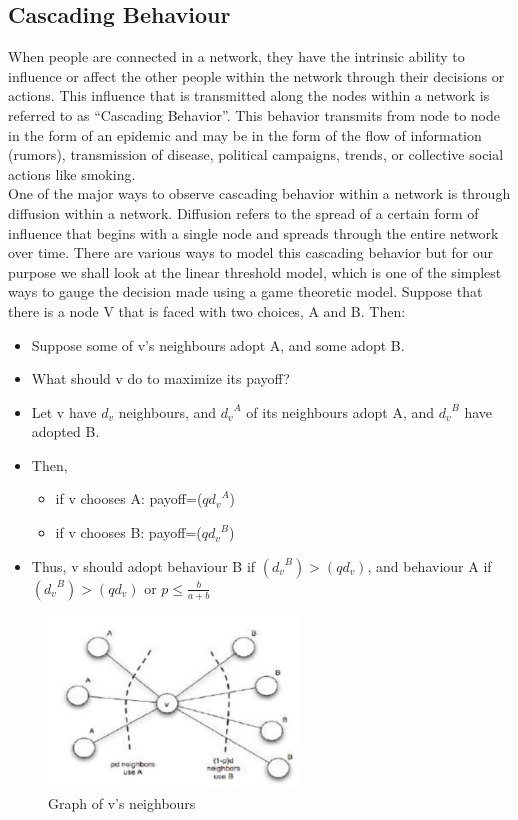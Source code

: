 \documentclass[runningheads]{llncs}
\begin{document}
\subsection{Cascading Behaviour}
When people are connected in a network, they have the intrinsic ability to influence or affect the other people within the network through their decisions or actions. This influence that is transmitted along the nodes within a network is referred to as “Cascading Behavior”. This behavior transmits from node to node in the form of an epidemic and may be in the form of the flow of information (rumors), transmission of disease, political campaigns, trends, or collective social actions like smoking.\\

One of the major ways to observe cascading behavior within a network is through diffusion within a network. Diffusion refers to the spread of a certain form of influence that begins with a single node and spreads through the entire network over time. There are various ways to model this cascading behavior but for our purpose we shall look at the linear threshold model, which is one of the simplest ways to gauge the decision made using a game theoretic model. Suppose that there is a node V that is faced with two choices, A and B. Then:
    \begin{itemize}
        \item Suppose some of v's neighbours adopt A, and some adopt B.
        \item What should v do to maximize its payoff?
        \item Let v have $d_v$ neighbours, and ${d_v}^A$ of its neighbours adopt A, and ${d_v}^B$ have adopted B.
        \item Then, 
        \begin{itemize}
            \item if v chooses A: payoff=($q{d_v}^A$)
            \item if v chooses B: payoff=($q{d_v}^B$)
        \end{itemize}
        \item Thus, v should adopt behaviour B if $({d_v}^B)>(qd_v)$, and behaviour A if $({d_v}^B)>(qd_v)$ or $p\leq \frac{b}{a+b}$
    \end{itemize}

\begin{figure}[H]
    \centering
  \includegraphics[width=0.6\textwidth]{netwroks.PNG}
    \caption{Graph of v's neighbours}
\end{figure}
\end{document}
